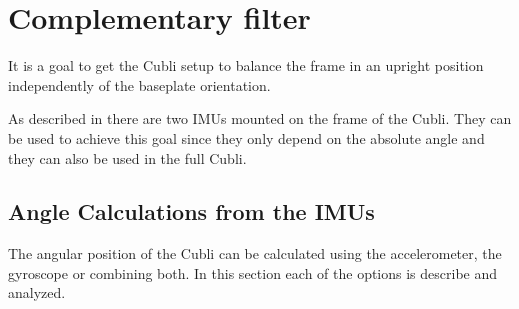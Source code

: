 \chapter{Complementary filter}\label{chap:CompFilter} 
It is a goal to get the Cubli setup to balance the frame in an upright position independently of the baseplate orientation.

As described in  there are two IMUs mounted on the frame of the Cubli. They can be used to achieve this goal since they only depend on the absolute angle and they can also be used in the full Cubli.

\section{Angle Calculations from the IMUs}
The angular position of the Cubli can be calculated using the accelerometer, the gyroscope or combining both. In this section each of the options is describe and analyzed.

